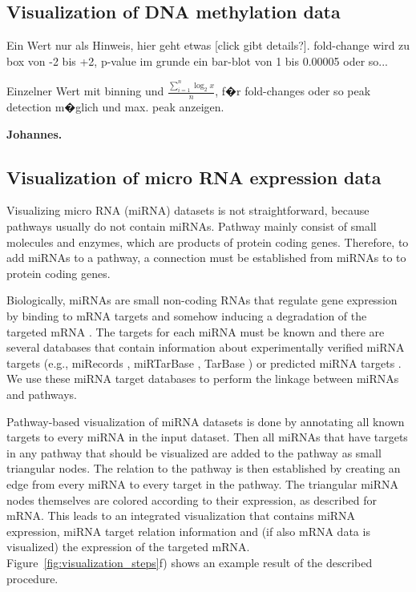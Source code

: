 \documentclass{bioinfo}
\begin{document}
\subsection{Visualization of DNA methylation data}

Ein Wert nur als Hinweis, hier geht etwas [click gibt details?]. fold-change wird zu box von -2 bis +2, p-value im grunde ein bar-blot von 1 bis 0.00005 oder so...

Einzelner Wert mit binning und $\frac{\sum\limits_{i=1}^n\log_2 x}{n}$, f�r fold-changes oder so peak detection m�glich und max. peak anzeigen.

\textbf{Johannes.}


\subsection{Visualization of micro RNA expression data}

Visualizing micro RNA (miRNA) datasets is not straightforward, because pathways usually do not contain miRNAs. Pathway mainly consist of small molecules and enzymes, which are products of protein coding genes. Therefore, to add miRNAs to a pathway, a connection must be established from miRNAs to to protein coding genes.

Biologically, miRNAs are small non-coding RNAs that regulate gene expression by binding to mRNA targets and somehow inducing a degradation of the targeted mRNA \citep{Bartel2004}. The targets for each miRNA must be known and there are several databases that contain information about experimentally verified miRNA targets (e.g., miRecords \citep[see][]{miRecords}, miRTarBase \citep[see][]{miRTarBase}, TarBase \citep[see][]{TarBase}) or predicted miRNA targets \citep{Alexiou2009}. We use these miRNA target databases to perform the linkage between miRNAs and pathways.

Pathway-based visualization of miRNA datasets is done by annotating all known targets to every miRNA in the input dataset. Then all miRNAs that have targets in any pathway that should be visualized are added to the pathway as small triangular nodes. The relation to the pathway is then established by creating an edge from every miRNA to every target in the pathway. The triangular miRNA nodes themselves are colored according to their expression, as described for mRNA. 
This leads to an integrated visualization that contains miRNA expression, miRNA target relation information and (if also mRNA data is visualized) the expression of the targeted mRNA. Figure~\ref{fig:visualization_steps}f) shows an example result of the described procedure.
\end{document}
